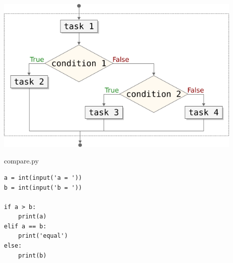 \documentclass[aspectratio=1610,t]{beamer}
\begin{document}
\begin{pframe}
 \begin{minipage}{0.57\textwidth}
 \begin{center}
   \includegraphics[width=0.90\textwidth]{../../images/flow_conditional_chained_if.pdf}
 \end{center}
 \end{minipage}%
 \begin{minipage}{0.37\textwidth}
 \begin{pythonfile}{compare.py}
  \begin{verbatim}
a = int(input('a = '))
b = int(input('b = '))

if a > b:
    print(a)
elif a == b:
    print('equal')
else:
    print(b)
  \end{verbatim}
 \end{pythonfile}

 \begin{terminal}
 \end{terminal}
 \end{minipage}
\end{pframe}
\end{document}
